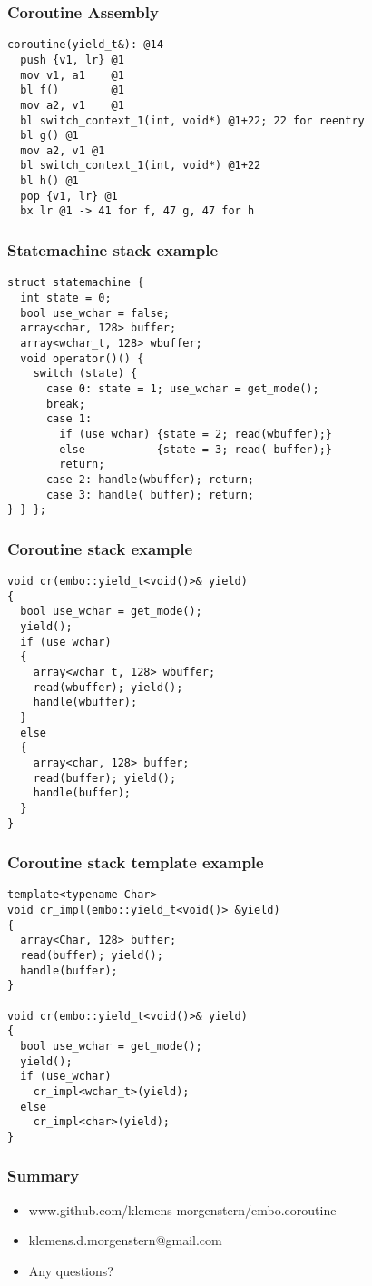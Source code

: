 \documentclass{beamer}
\begin{document}
\begin{frame}[fragile]
\frametitle{Coroutine Assembly}
\begin{block}{}
\begin{lstlisting}[language=ASM, basicstyle=\small]
coroutine(yield_t&): @14
  push {v1, lr} @1
  mov v1, a1	@1  
  bl f()        @1
  mov a2, v1    @1
  bl switch_context_1(int, void*) @1+22; 22 for reentry
  bl g() @1
  mov a2, v1 @1
  bl switch_context_1(int, void*) @1+22
  bl h() @1
  pop {v1, lr} @1
  bx lr @1 -> 41 for f, 47 g, 47 for h
\end{lstlisting}
\end{block}
\end{frame}

\begin{frame}[fragile]
\frametitle{Statemachine stack example}
\begin{block}{}
\begin{lstlisting}[basicstyle=\small]
struct statemachine {
  int state = 0;
  bool use_wchar = false;
  array<char, 128> buffer;
  array<wchar_t, 128> wbuffer;
  void operator()() {
    switch (state) {
      case 0: state = 1; use_wchar = get_mode(); 
      break;
      case 1: 
        if (use_wchar) {state = 2; read(wbuffer);}
        else           {state = 3; read( buffer);}
        return;
      case 2: handle(wbuffer); return; 
      case 3: handle( buffer); return;
} } };
\end{lstlisting}
\end{block}
\end{frame}

\begin{frame}[fragile]
\frametitle{Coroutine stack example}
\begin{block}{}
\begin{lstlisting}[basicstyle=\small]
void cr(embo::yield_t<void()>& yield)
{
  bool use_wchar = get_mode();
  yield();
  if (use_wchar)
  {
    array<wchar_t, 128> wbuffer;
    read(wbuffer); yield();
    handle(wbuffer);
  }
  else
  {
    array<char, 128> buffer;
    read(buffer); yield();
    handle(buffer);
  }
}
\end{lstlisting}
\end{block}
\end{frame}

\begin{frame}[fragile]
\frametitle{Coroutine stack template example}
\begin{block}{}
\begin{lstlisting}[basicstyle=\small]
template<typename Char>
void cr_impl(embo::yield_t<void()> &yield)
{
  array<Char, 128> buffer;
  read(buffer); yield();
  handle(buffer);
}

void cr(embo::yield_t<void()>& yield)
{
  bool use_wchar = get_mode();
  yield();
  if (use_wchar)
    cr_impl<wchar_t>(yield);
  else
    cr_impl<char>(yield);
}
\end{lstlisting}
\end{block}
\end{frame}

\begin{frame}
\frametitle{Summary}
\begin{itemize}
\item<1-> www.github.com/klemens-morgenstern/embo.coroutine
\item<2-> klemens.d.morgenstern@gmail.com
\item<3-> Any questions?
\end{itemize}

\end{frame}
\end{document}
